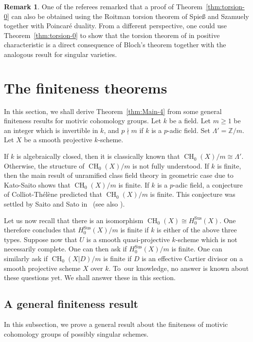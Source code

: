 \documentclass[11pt]{article}
\numberwithin{equation}{section}
\newcommand{\sus}{\mathrm{Sus}}
\theoremstyle{definition}
\newtheorem{remk}[thm]{Remark}
\newcommand{\thmref}{Theorem~\ref}
\newcommand{\Z}{{\mathbb Z}}
\DeclareMathOperator{\CH}{CH}
\begin{document}
\begin{remk}\label{remk:SS}
One of the referees remarked that a proof of \thmref{thm:torsion-0} can also be
obtained using the Roitman torsion theorem of Spie{\ss} and Szamuely \cite{SS} together with Poincaré duality.
From a different perspective, one could use \thmref{thm:torsion-0} to show that the torsion theorem
of \cite{SS} in positive characteristic is a direct consequence of
Bloch's theorem together with the analogous result for singular varieties.
\end{remk}

\section{The finiteness theorems}
\label{sec:Finiteness}
In this section, we shall derive \thmref{thm:Main-4} from
some general finiteness results for motivic cohomology groups.
Let $k$ be a field. Let $m \ge 1$ be an integer which is invertible in $k$,
and $p \nmid m$ if $k$ is a $p$-adic field. Set $\Lambda' = {\Z}/m$.
Let $X$ be a smooth projective $k$-scheme.

If $k$ is algebraically closed, then it is classically
known that ${\CH_0(X)}/m \cong \Lambda'$.
Otherwise, the structure of ${\CH_0(X)}/m$ is not fully understood.
If $k$ is finite, then the main result of unramified class field
theory in geometric case due to Kato-Saito \cite{Kato-Saito-1} shows that
${\CH_0(X)}/m$ is finite. If $k$ is a $p$-adic field, a conjecture of
Colliot-Thélène predicted that ${\CH_0(X)}/m$ is finite.
This conjecture was settled by Saito and Sato in~\cite{SaitoSatoAnnals}
(see also \cite[Prop.\,9.3]{EKW}).

Let us now recall that there is an isomorphism
${\CH_0(X)} \cong H^{\sus}_0(X)$. One therefore concludes that
${H^{\sus}_0(X)}/m$ is finite if $k$ is either of the above three types.
Suppose now that $U$ is a smooth quasi-projective $k$-scheme
which is not necessarily complete. One can then ask if
${H^{\sus}_0(X)}/m$ is finite. One can similarly ask
if ${\CH_0(X|D)}/m$ is finite if $D$ is an effective Cartier divisor on
a smooth projective scheme $X$ over $k$. To~our knowledge, no answer is known about
these questions yet. We shall answer these in this section.

\subsection{A general finiteness result}\label{sec:Fin-gen}
In this subsection, we prove a general result about the finiteness of motivic
cohomology groups of possibly singular schemes.
\end{document}
